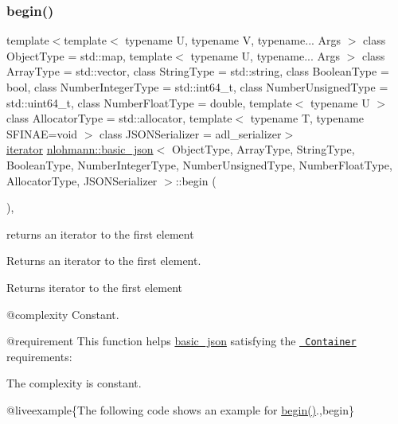 \subsubsection{\texorpdfstring{begin()}{begin()}\hspace{0.1cm}{\footnotesize\ttfamily [1/2]}}
{\footnotesize\ttfamily template$<$template$<$ typename U, typename V, typename... Args $>$ class Object\+Type = std\+::map, template$<$ typename U, typename... Args $>$ class Array\+Type = std\+::vector, class String\+Type  = std\+::string, class Boolean\+Type  = bool, class Number\+Integer\+Type  = std\+::int64\+\_\+t, class Number\+Unsigned\+Type  = std\+::uint64\+\_\+t, class Number\+Float\+Type  = double, template$<$ typename U $>$ class Allocator\+Type = std\+::allocator, template$<$ typename T, typename S\+F\+I\+N\+A\+E=void $>$ class J\+S\+O\+N\+Serializer = adl\+\_\+serializer$>$ \\
\mbox{\hyperlink{classnlohmann_1_1basic__json_a099316232c76c034030a38faa6e34dca}{iterator}} \mbox{\hyperlink{classnlohmann_1_1basic__json}{nlohmann\+::basic\+\_\+json}}$<$ Object\+Type, Array\+Type, String\+Type, Boolean\+Type, Number\+Integer\+Type, Number\+Unsigned\+Type, Number\+Float\+Type, Allocator\+Type, J\+S\+O\+N\+Serializer $>$\+::begin (\begin{DoxyParamCaption}{ }\end{DoxyParamCaption})\hspace{0.3cm}{\ttfamily [inline]}, {\ttfamily [noexcept]}}



returns an iterator to the first element 

Returns an iterator to the first element.

 \begin{DoxyReturn}{Returns}
iterator to the first element
\end{DoxyReturn}
@complexity Constant.

@requirement This function helps {\ttfamily \mbox{\hyperlink{classnlohmann_1_1basic__json}{basic\+\_\+json}}} satisfying the \href{http://en.cppreference.com/w/cpp/concept/Container}{\texttt{ Container}} requirements\+:
\begin{DoxyItemize}
\item The complexity is constant.
\end{DoxyItemize}

@liveexample\{The following code shows an example for {\ttfamily \mbox{\hyperlink{classnlohmann_1_1basic__json_a0ff28dac23f2bdecee9564d07f51dcdc}{begin()}}}.,begin\}

